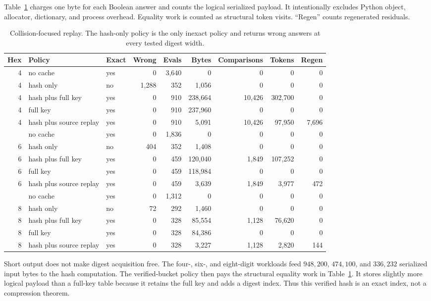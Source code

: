 \documentclass[11pt]{article}
\begin{document}
Table~\ref{tab:cache} charges one byte for each Boolean answer and counts the
logical serialized payload.  It intentionally excludes Python object,
allocator, dictionary, and process overhead.  Equality work is counted as
structural token visits.  ``Regen'' counts regenerated residuals.

\begin{table}[htbp]
\centering
\scriptsize
\begin{tabular}{@{}rllrrrrrr@{}}
\toprule
Hex & Policy & Exact & Wrong & Evals & Bytes & Comparisons & Tokens & Regen\\
\midrule
4 & no cache & yes & 0 & 3,640 & 0 & 0 & 0 & 0\\
4 & hash only & no & 1,288 & 352 & 1,056 & 0 & 0 & 0\\
4 & hash plus full key & yes & 0 & 910 & 238,664 & 10,426 & 302,700 & 0\\
4 & full key & yes & 0 & 910 & 237,960 & 0 & 0 & 0\\
4 & hash plus source replay & yes & 0 & 910 & 5,091 & 10,426 & 97,950 & 7,696\\
\addlinespace
6 & no cache & yes & 0 & 1,836 & 0 & 0 & 0 & 0\\
6 & hash only & no & 404 & 352 & 1,408 & 0 & 0 & 0\\
6 & hash plus full key & yes & 0 & 459 & 120,040 & 1,849 & 107,252 & 0\\
6 & full key & yes & 0 & 459 & 118,984 & 0 & 0 & 0\\
6 & hash plus source replay & yes & 0 & 459 & 3,639 & 1,849 & 3,977 & 472\\
\addlinespace
8 & no cache & yes & 0 & 1,312 & 0 & 0 & 0 & 0\\
8 & hash only & no & 72 & 292 & 1,460 & 0 & 0 & 0\\
8 & hash plus full key & yes & 0 & 328 & 85,554 & 1,128 & 76,620 & 0\\
8 & full key & yes & 0 & 328 & 84,386 & 0 & 0 & 0\\
8 & hash plus source replay & yes & 0 & 328 & 3,227 & 1,128 & 2,820 & 144\\
\bottomrule
\end{tabular}
\caption{Collision-focused replay.  The hash-only policy is the only inexact
policy and returns wrong answers at every tested digest width.}
\label{tab:cache}
\end{table}

Short output does not make digest acquisition free.  The four-, six-, and
eight-digit workloads feed $948{,}200$, $474{,}100$, and $336{,}232$
serialized input bytes to the hash computation.  The verified-bucket policy
then pays the structural equality work in Table~\ref{tab:cache}.  It stores
slightly more logical payload than a full-key table because it retains the
full key and adds a digest index.  Thus this verified hash is an exact index,
not a compression theorem.
\end{document}
